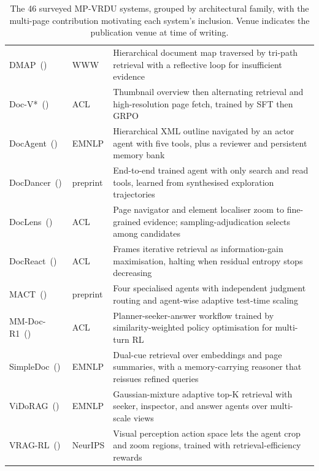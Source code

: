 \begin{table}[p]
\begin{tabularx}{\textwidth}{@{}l l >{\raggedright\arraybackslash}X@{}}
\rowcolor{sectionbg}
\multicolumn{3}{l}{\textbf{Adaptive-Trajectory Pipelines}} \\
\midrule
  {DMAP}~(\citeyear{fu2026dmap}) & WWW & Hierarchical document map traversed by tri-path retrieval with a reflective loop for insufficient evidence \\
  {Doc-V*}~(\citeyear{zheng2026docvstar}) & ACL & Thumbnail overview then alternating retrieval and high-resolution page fetch, trained by SFT then GRPO \\
  {DocAgent}~(\citeyear{sun2025docagent}) & EMNLP & Hierarchical XML outline navigated by an actor agent with five tools, plus a reviewer and persistent memory bank \\
  {DocDancer}~(\citeyear{zhang2026docdancer}) & preprint & End-to-end trained agent with only search and read tools, learned from synthesised exploration trajectories \\
  {DocLens}~(\citeyear{zhu2026doclens}) & ACL & Page navigator and element localiser zoom to fine-grained evidence; sampling-adjudication selects among candidates \\
  {DocReact}~(\citeyear{wu2025docreact}) & ACL & Frames iterative retrieval as information-gain maximisation, halting when residual entropy stops decreasing \\
  {MACT}~(\citeyear{yu2025mact}) & preprint & Four specialised agents with independent judgment routing and agent-wise adaptive test-time scaling \\
  {MM-Doc-R1}~(\citeyear{lin2026mmdocr1}) & ACL & Planner-seeker-answer workflow trained by similarity-weighted policy optimisation for multi-turn RL \\
  {SimpleDoc}~(\citeyear{jain2025simpledoc}) & EMNLP & Dual-cue retrieval over embeddings and page summaries, with a memory-carrying reasoner that reissues refined queries \\
  {ViDoRAG}~(\citeyear{wang2025vidorag}) & EMNLP & Gaussian-mixture adaptive top-K retrieval with seeker, inspector, and answer agents over multi-scale views \\
  {VRAG-RL}~(\citeyear{wang2026vragrl}) & NeurIPS & Visual perception action space lets the agent crop and zoom regions, trained with retrieval-efficiency rewards \\

\bottomrule
\end{tabularx}
\caption{The 46 surveyed MP-VRDU systems, grouped by architectural family, with the multi-page contribution motivating each system's inclusion. Venue indicates the publication venue at time of writing.}
\label{tab:survey_corpus}
\end{table}